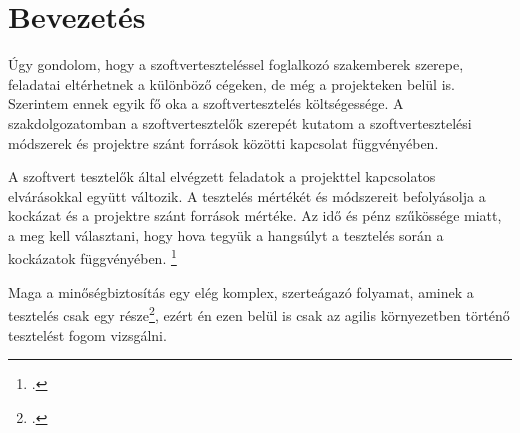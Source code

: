 \section{Bevezetés}
Úgy gondolom, hogy a szoftverteszteléssel foglalkozó szakemberek szerepe, feladatai eltérhetnek a különböző cégeken, de még a projekteken belül is.
Szerintem ennek egyik fő oka a szoftvertesztelés költségessége. A szakdolgozatomban a szoftvertesztelők szerepét kutatom a szoftvertesztelési módszerek és projektre szánt források közötti kapcsolat függvényében.

A szoftvert tesztelők által elvégzett feladatok a projekttel kapcsolatos elvárásokkal együtt változik.
A tesztelés mértékét és módszereit befolyásolja a kockázat és a projektre szánt források mértéke. Az idő és pénz szűkössége miatt, a meg kell választani, hogy hova tegyük a hangsúlyt a tesztelés során a kockázatok függvényében. \footcite{istqbfoundations}

Maga a minőségbiztosítás egy elég komplex, szerteágazó folyamat, aminek a tesztelés csak egy része\footcite{softwarequalityassurance2016}, ezért én ezen belül is csak az agilis környezetben történő tesztelést fogom vizsgálni.